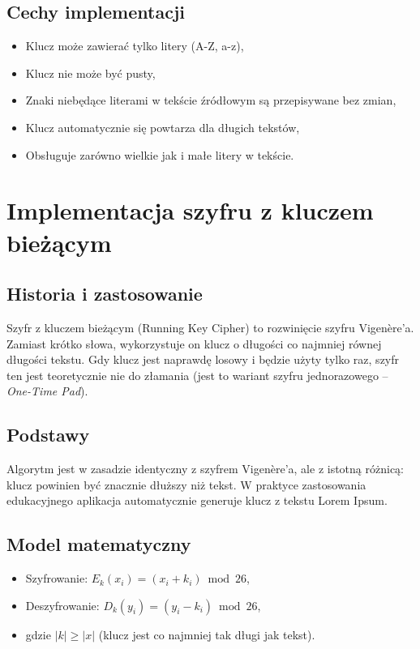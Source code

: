 \documentclass[12pt,a4paper]{article}
\begin{document}
\subsection{Cechy implementacji}
\begin{itemize}
    \item Klucz może zawierać tylko litery (A-Z, a-z),
    \item Klucz nie może być pusty,
    \item Znaki niebędące literami w tekście źródłowym są przepisywane bez zmian,
    \item Klucz automatycznie się powtarza dla długich tekstów,
    \item Obsługuje zarówno wielkie jak i małe litery w tekście.
\end{itemize}
\newpage
\section{Implementacja szyfru z kluczem bieżącym}

\subsection{Historia i zastosowanie}
Szyfr z kluczem bieżącym (Running Key Cipher) to rozwinięcie szyfru Vigenère'a. 
Zamiast krótko słowa, wykorzystuje on klucz o długości co najmniej równej długości tekstu. 
Gdy klucz jest naprawdę losowy i będzie użyty tylko raz, szyfr ten jest teoretycznie nie do złamania 
(jest to wariant szyfru jednorazowego -- \textit{One-Time Pad}).

\subsection{Podstawy}
Algorytm jest w zasadzie identyczny z szyfrem Vigenère'a, ale z istotną różnicą: 
klucz powinien być znacznie dłuższy niż tekst. W praktyce zastosowania edukacyjnego 
aplikacja automatycznie generuje klucz z tekstu Lorem Ipsum.

\subsection{Model matematyczny}
\begin{itemize}
    \item Szyfrowanie: $E_{k}(x_i) = (x_i + k_i) \bmod 26$,
    \item Deszyfrowanie: $D_{k}(y_i) = (y_i - k_i) \bmod 26$,
    \item gdzie $|k| \geq |x|$ (klucz jest co najmniej tak długi jak tekst).
\end{itemize}
\end{document}
